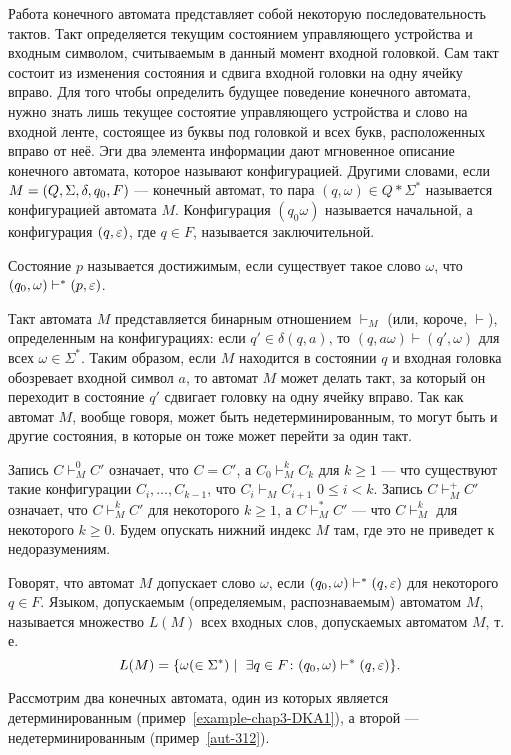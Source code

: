 Работа конечного автомата представляет собой некоторую последовательность тактов. Такт определяется текущим состоянием управляющего устройства и входным символом, считываемым в данный момент входной головкой. Сам такт состоит из изменения состояния и сдвига входной головки на одну ячейку вправо. Для того чтобы определить будущее поведение конечного автомата, нужно знать лишь текущее состоятие управляющего устройства и слово на входной ленте, состоящее из буквы под головкой и всех букв, расположенных вправо от неё. Эги два элемента информации дают мгновенное описание конечного автомата, которое называют конфигурацией. Другими словами, если $M = (Q,\\ \Sigma, \delta, q_0, F)$ --- конечный автомат, то пара $(q,\omega)\in Q*\Sigma^*$ называется конфигурацией автомата $M$. Конфигурация $(q_0\omega)$ называется начальной, а конфигурация $(q,\varepsilon)$, где $q\in F$, называется заключительной.

Состояние $p$ называется достижимым, если существует такое слово $\omega$, что $(q_0,\omega)\vdash^*(p,\varepsilon)$.

Такт автомата $M$ представляется бинарным отношением $\vdash_M$ (или, короче, $\vdash$), определенным на конфигурациях: если $q'\in\delta(q,a)$, то $(q,a\omega)\vdash(q',\omega)$ для всех $\omega\in\Sigma^*$. Таким образом, если $M$ находится в состоянии $q$ и входная головка обозревает входной символ $a$, то автомат $M$ может делать такт, за который он переходит в состояние $q'$ сдвигает головку на одну ячейку вправо. Так как автомат $M$, вообще говоря, может быть недетерминированным, то могут быть и другие состояния, в которые он тоже может перейти за один такт.

Запись $C\vdash_M^0 C'$ означает, что $C=C'$, а $C_0\vdash_M^kC_k$ для $k\ge 1$ --- что существуют такие конфигурации $C_i, \ldots ,C_{k-1}$, что $C_i\vdash_MC_{i+1}$ $0\le i<k$. Запись $C\vdash_M^+C'$ означает, что $C\vdash_M^kC'$ для некоторого $k\ge 1$, а $C\vdash_M^*C'$ --- что $C\vdash_M^k$ для некоторого $k\ge 0$. Будем опускать нижний индекс $M$ там, где это не приведет к недоразумениям.

Говорят, что автомат $M$ допускает слово $\omega$, если $(q_0,\omega)\vdash^*(q,\varepsilon)$ для некоторого $q\in F$. Языком, допускаемым (определяемым, распознаваемым) автоматом $M$, называется множество $L(M)$ всех входных слов, допускаемых автоматом $M$, т. е.
\[
	L(M)=\{\omega(\in\Sigma^*)\mid~\exists q\in F\colon (q_0,\omega)\vdash^*(q,\varepsilon)\}.
\]

Рассмотрим два конечных автомата, один из которых является детерминированным (пример~\ref{example-chap3-DKA1}), а второй --- недетерминированным (пример~\ref{aut-312}).

